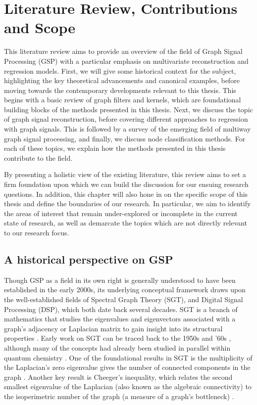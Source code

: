 \chapter{Literature Review, Contributions and Scope} 

\label{chap:lit_review} 


This literature review aims to provide an overview of the field of Graph Signal Processing (GSP) with a particular emphasis on multivariate reconstruction and regression models. First, we will give some historical context for the subject, highlighting the key theoretical advancements and canonical examples, before moving towards the contemporary developments relevant to this thesis. This begins with a basic review of graph filters and kernels, which are foundational building blocks of the methods presented in this thesis. Next, we discuss the topic of graph signal reconstruction, before covering different approaches to regression with graph signals. This is followed by a survey of the emerging field of multiway graph signal processing, and finally, we discuss node classification methods. For each of these topics, we explain how the methods presented in this thesis contribute to the field. 

By presenting a holistic view of the existing literature, this review aims to set a firm foundation upon which we can build the discussion for our ensuing research questions. In addition, this chapter will also hone in on the specific scope of this thesis and define the boundaries of our research. In particular, we aim to identify the areas of interest that remain under-explored or incomplete in the current state of research, as well as demarcate the topics which are not directly relevant to our research focus. 


\section{A historical perspective on GSP}

Though GSP as a field in its own right is generally understood to have been established in the early 2000s, its underlying conceptual framework draws upon the well-established fields of Spectral Graph Theory (SGT), and Digital Signal Processing (DSP), which both date back several decades. SGT is a branch of mathematics that studies the eigenvalues and eigenvectors associated with a graph's adjacency or Laplacian matrix to gain insight into its structural properties \citep{Chung1997}. Early work on SGT can be traced back to the 1950s and '60s \citep{Collatz1957, Hoffman1969}, although many of the concepts had already been studied in parallel within quantum chemistry \citep{Huckel1931}. One of the foundational results in SGT is the multiplicity of the Laplacian's zero eigenvalue gives the number of connected components in the graph \citep{Cvetkovic1980}. Another key result is Cheeger's inequality, which relates the second smallest eigenvalue of the Laplacian (also known as the algebraic connectivity) to the isoperimetric number of the graph (a measure of a graph's bottleneck) \citep{Cheeger1971}. 

